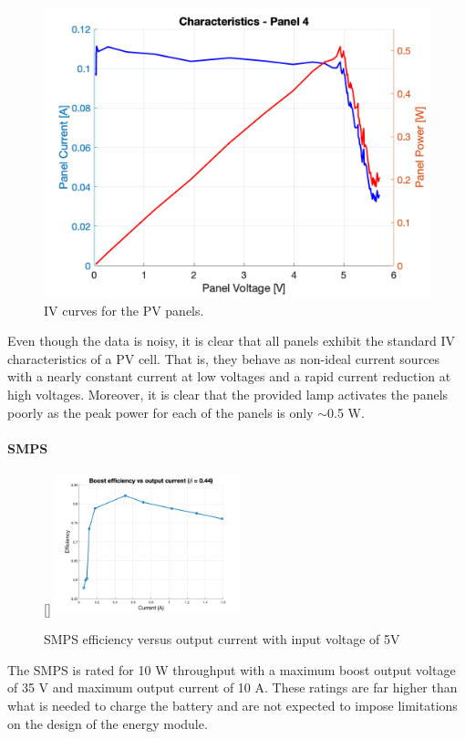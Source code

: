 \documentclass[a4paper]{article}
\begin{document}
\begin{figure}[H]
    \includegraphics[scale=0.18]{Panel4.png}
    \caption{IV curves for the PV panels.}
    \label{fig:IV_curve}
\end{figure}

Even though the data is noisy, it is clear that all panels exhibit the 
standard IV characteristics of a PV cell. That is, they behave as 
non-ideal current sources with a nearly constant current at low 
voltages and a rapid current reduction at high voltages\cite{green}. 
Moreover, it is clear that the provided lamp activates the panels poorly 
as the peak power for each of the panels is only $\sim$0.5 W.

\paragraph*{SMPS}
\begin{figure}
    \centering
    \raisebox{0pt}[\dimexpr{}\baselineskip\relax]{%
        \includegraphics[trim=0pt 0pt 0pt 0pt,width=0.48\textwidth]{Boost_efficiency_wduty.png}
    }%
    \vspace{-5pt}
    \caption{SMPS efficiency versus output current with input voltage of 5V\cite{powerLogbook}}
    \label{fig:efficiency}
\end{figure}
The SMPS is rated for 10 W throughput with a maximum boost output voltage 
of 35 V and maximum output current of 10 A\cite{SMPS_lab}. These ratings 
are far higher than what is needed to charge the battery and are not 
expected to impose limitations on the design of the energy module. 
\end{document}
